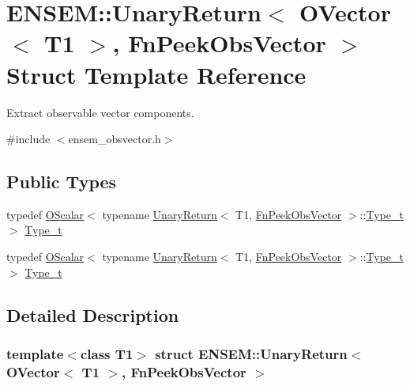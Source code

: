 \hypertarget{structENSEM_1_1UnaryReturn_3_01OVector_3_01T1_01_4_00_01FnPeekObsVector_01_4}{}\section{E\+N\+S\+EM\+:\+:Unary\+Return$<$ O\+Vector$<$ T1 $>$, Fn\+Peek\+Obs\+Vector $>$ Struct Template Reference}
\label{structENSEM_1_1UnaryReturn_3_01OVector_3_01T1_01_4_00_01FnPeekObsVector_01_4}


Extract observable vector components.  




{\ttfamily \#include $<$ensem\+\_\+obsvector.\+h$>$}

\subsection*{Public Types}
\begin{DoxyCompactItemize}
\item 
typedef \mbox{\hyperlink{classENSEM_1_1OScalar}{O\+Scalar}}$<$ typename \mbox{\hyperlink{structENSEM_1_1UnaryReturn}{Unary\+Return}}$<$ T1, \mbox{\hyperlink{structENSEM_1_1FnPeekObsVector}{Fn\+Peek\+Obs\+Vector}} $>$\+::\mbox{\hyperlink{structENSEM_1_1UnaryReturn_3_01OVector_3_01T1_01_4_00_01FnPeekObsVector_01_4_a389e8e049203dcaaa7ef75769364c944}{Type\+\_\+t}} $>$ \mbox{\hyperlink{structENSEM_1_1UnaryReturn_3_01OVector_3_01T1_01_4_00_01FnPeekObsVector_01_4_a389e8e049203dcaaa7ef75769364c944}{Type\+\_\+t}}
\item 
typedef \mbox{\hyperlink{classENSEM_1_1OScalar}{O\+Scalar}}$<$ typename \mbox{\hyperlink{structENSEM_1_1UnaryReturn}{Unary\+Return}}$<$ T1, \mbox{\hyperlink{structENSEM_1_1FnPeekObsVector}{Fn\+Peek\+Obs\+Vector}} $>$\+::\mbox{\hyperlink{structENSEM_1_1UnaryReturn_3_01OVector_3_01T1_01_4_00_01FnPeekObsVector_01_4_a389e8e049203dcaaa7ef75769364c944}{Type\+\_\+t}} $>$ \mbox{\hyperlink{structENSEM_1_1UnaryReturn_3_01OVector_3_01T1_01_4_00_01FnPeekObsVector_01_4_a389e8e049203dcaaa7ef75769364c944}{Type\+\_\+t}}
\end{DoxyCompactItemize}


\subsection{Detailed Description}
\subsubsection*{template$<$class T1$>$\newline
struct E\+N\+S\+E\+M\+::\+Unary\+Return$<$ O\+Vector$<$ T1 $>$, Fn\+Peek\+Obs\+Vector $>$}

